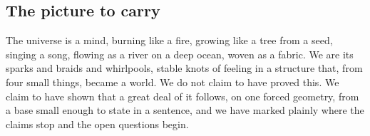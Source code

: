 \subsection{The picture to carry}

The universe is a mind, burning like a fire, growing like a tree from a seed, singing a song, flowing as a river
on a deep ocean, woven as a fabric. We are its sparks and braids and whirlpools, stable knots of feeling in a
structure that, from four small things, became a world. We do not claim to have proved this. We claim to have
shown that a great deal of it follows, on one forced geometry, from a base small enough to state in a sentence,
and we have marked plainly where the claims stop and the open questions begin.
